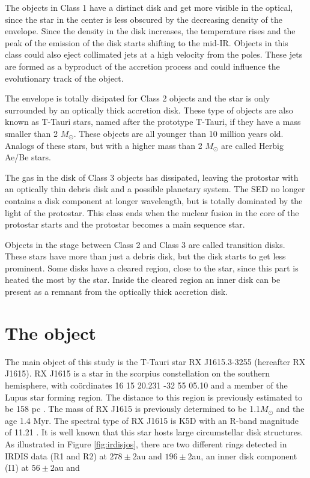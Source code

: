 \documentclass[twoside,single]{lion-msc}
\begin{document}
The objects in Class 1 have a distinct disk and get more visible in the optical, since the star in the center is less obscured by the decreasing density of the envelope. Since the density in the disk increases, the temperature rises and the peak of the emission of the disk starts shifting to the mid-IR. Objects in this class could also eject collimated jets at a high velocity from the poles. These jets are formed as a byproduct of the accretion process and could influence the evolutionary track of the object.
\bigskip

The envelope is totally disipated for Class 2 objects and the star is only surrounded by an optically thick accretion disk. These type of objects are also known as T-Tauri stars, named after the prototype T-Tauri, if they have a mass smaller than 2 $M_\odot$. These objects are all younger than 10 million years old. Analogs of these stars, but with a higher mass than 2 $M_\odot$ are called Herbig Ae/Be stars. 
\bigskip

The gas in the disk of Class 3 objects has dissipated, leaving the protostar with an optically thin debris disk and a possible planetary system. The SED no longer contains a disk component at longer wavelength, but is totally dominated by the light of the protostar. This class ends when the nuclear fusion in the core of the protostar starts and the protostar becomes a main sequence star.
\bigskip

Objects in the stage between Class 2 and Class 3 are called transition disks. These stars  have more than just a debris disk, but the disk starts to get less prominent. Some disks have a cleared region, close to the star, since this part is heated the most by the star. Inside the cleared region an inner disk can be present as a remnant from the optically thick accretion disk.

\section{The object}
The main object of this study is the T-Tauri star RX J1615.3-3255 (hereafter RX J1615). RX J1615 is a star in the scorpius constellation on the southern hemisphere, with co\"ordinates 16 15 20.231 -32 55 05.10 and a member of the Lupus star forming region. The distance to this region is previously estimated to be 158 pc \cite{Gaia2018}. The mass of RX J1615 is previously determined to be 1.1$M_\odot$ and the age 1.4 Myr\cite{Wahhaj2010}. The spectral type of RX J1615 is K5D with an R-band magnitude of 11.21 \cite{Krautter1997}. It is well known that this star hosts large circumstellar disk structures. As illustrated in Figure \ref{fig:irdisjos}, there are two different rings detected in IRDIS data (R1 and R2) at $278\pm 2$au and $196\pm 2$au, an inner disk component (I1) at $56\pm 2$au and
\end{document}
